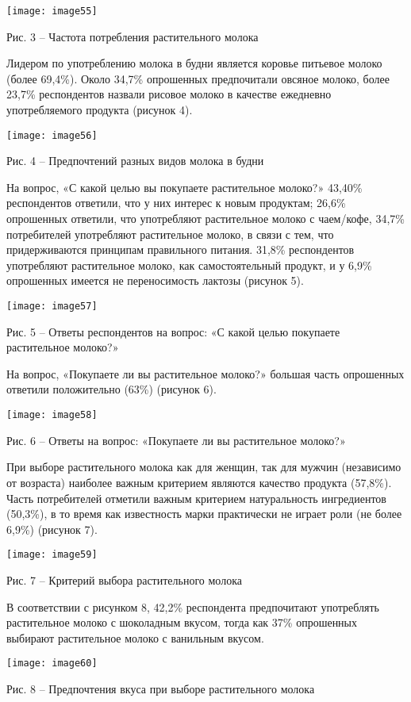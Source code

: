 \texttt{[image: image55]}

Рис. 3 -- Частота потребления растительного молока

Лидером по употреблению молока в будни является коровье питьевое молоко
(более 69,4\%). Около 34,7\% опрошенных предпочитали овсяное молоко,
более 23,7\% респондентов назвали рисовое молоко в качестве ежедневно
употребляемого продукта (рисунок 4).

\texttt{[image: image56]}

Рис. 4 -- Предпочтений разных видов молока в будни

На вопрос, «С какой целью вы покупаете растительное молоко?» 43,40\%
респондентов ответили, что у них интерес к новым продуктам; 26,6\%
опрошенных ответили, что употребляют растительное молоко с чаем/кофе,
34,7\% потребителей употребляют растительное молоко, в связи с тем, что
придерживаются принципам правильного питания. 31,8\% респондентов
употребляют растительное молоко, как самостоятельный продукт, и у 6,9\%
опрошенных имеется не переносимость лактозы (рисунок 5).

\texttt{[image: image57]}

Рис. 5 -- Ответы респондентов на вопрос: «С какой целью покупаете
растительное молоко?»

На вопрос, «Покупаете ли вы растительное молоко?» большая часть
опрошенных ответили положительно (63\%) (рисунок 6).

\texttt{[image: image58]}

Рис. 6 -- Ответы на вопрос: «Покупаете ли вы растительное молоко?»

При выборе растительного молока как для женщин, так для мужчин
(независимо от возраста) наиболее важным критерием являются качество
продукта (57,8\%). Часть потребителей отметили важным критерием
натуральность ингредиентов (50,3\%), в то время как известность марки
практически не играет роли (не более 6,9\%) (рисунок 7).

\texttt{[image: image59]}

Рис. 7 -- Критерий выбора растительного молока

В соответствии с рисунком 8, 42,2\% респондента предпочитают употреблять
растительное молоко с шоколадным вкусом, тогда как 37\% опрошенных
выбирают растительное молоко с ванильным вкусом.

\texttt{[image: image60]}

Рис. 8 -- Предпочтения вкуса при выборе растительного молока

